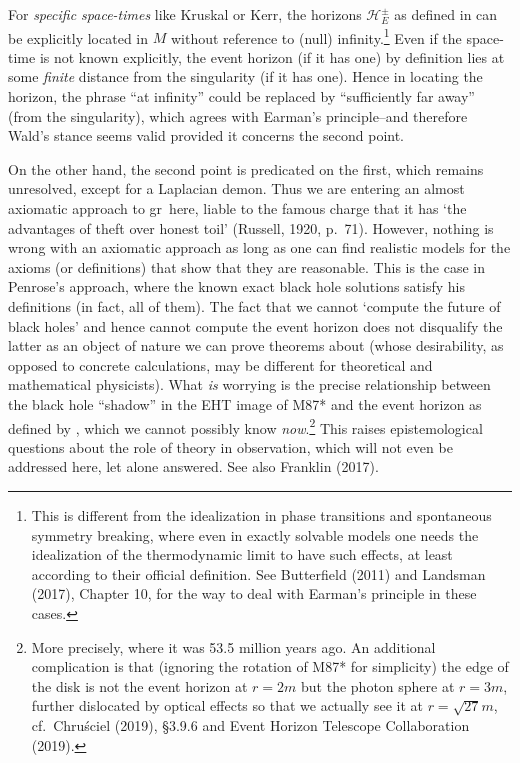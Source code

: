 \documentclass[11pt,a4paper]{article}
\newcommand{\GR}{{\sc gr}}
\begin{document}
For \emph{specific space-times} like Kruskal or Kerr, the horizons $\mathcal{H}_E^{\pm}$ as defined in  can be explicitly located in $M$ without reference to (null) infinity.\footnote{ 
This is different from the idealization in phase transitions and spontaneous symmetry breaking, where even in exactly solvable models one needs the idealization of the thermodynamic limit to have such effects, at least according to their official  definition. See Butterfield (2011) and Landsman (2017), Chapter 10,  for the way to deal with Earman's principle in these cases.} Even if the space-time is not known explicitly, the event horizon (if it has one) by definition lies at some \emph{finite} distance from the singularity (if it has one). Hence in locating the horizon, the phrase ``at infinity'' could be replaced by ``sufficiently far away'' (from the singularity), which agrees with Earman's principle--and therefore Wald's stance seems valid provided it concerns the second point. 

On the other hand, the second point is predicated on the first, which remains unresolved, except for a Laplacian demon. Thus we are entering an almost axiomatic approach to \GR\ here, liable to the  famous charge that it has `the advantages of theft over honest toil' (Russell, 1920, p.\ 71).
However, nothing is wrong with an axiomatic approach as long as one can find realistic models for the axioms  (or definitions) that show that they are reasonable. This 
 is the case in Penrose's approach, where the known exact black hole solutions satisfy his definitions (in fact, all of them). The fact that we cannot `compute the future of black holes' and hence cannot compute the event horizon does not disqualify the latter as an object of nature we can prove theorems about (whose desirability, as opposed to concrete calculations, may be different for theoretical and mathematical physicists). 
 What \emph{is} worrying is the precise relationship between the black hole ``shadow'' in the  
  EHT image of  M87* and the  event horizon as defined by , which we cannot possibly know \emph{now}.\footnote{More precisely, where it was 53.5 million years ago. An additional complication is that  (ignoring the rotation of M87* for simplicity) the edge of the disk is not the event horizon at $r=2m$ but the photon sphere 
 at $r=3m$, further dislocated by optical effects so that we actually see it at $r=\sqrt{27}m$, cf.\ Chru\'{s}ciel  (2019), \S 3.9.6 and  Event Horizon Telescope Collaboration (2019).
 }  This raises epistemological questions about the role of theory in observation, which will not even be addressed here, let alone answered. See also Franklin (2017). 
\end{document}
